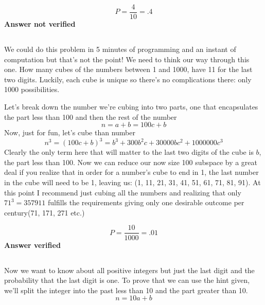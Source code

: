 \begin{equation}
	P=\frac{4}{10}=.4
\label{answer1.8}
\end{equation}
\textbf{Answer not verified}

\subsection{}

We could do this problem in 5 minutes of programming and an instant of computation but that's not the point!  We need to think our way through this one.  How many cubes of the numbers between 1 and 1000, have 11 for the last two digits.  Luckily, each cube is unique so there's no complications there: only 1000 possibilities.  

Let's break down the number we're cubing into two parts, one that encapsulates the part less than 100 and then the rest of the number
\begin{equation}
	n=a+b=100c+b
\end{equation}
Now, just for fun, let's cube than number
\begin{equation}
	n^3=(100c+b)^3=b^3+300 b^2 c+30000 b c^2+1000000 c^3
\end{equation}
Clearly the only term here that will matter to the last two digits of the cube is $b$, the part less than 100.  Now we can reduce our now size 100 subspace by a great deal if you realize that in order for a number's cube to end in 1, the last number in the cube will need to be 1, leaving us: (1, 11, 21, 31, 41, 51, 61, 71, 81, 91).  At this point I recommend just cubing all the numbers and realizing that only $71^3=357911$ fulfills the requirements giving only one desirable outcome per century(71, 171, 271 etc.)

\begin{equation}
	P=\frac{10}{1000}=.01
\label{answer1.9}
\end{equation}
\textbf{Answer verified}

\subsection{}
Now we want to know about all positive integers but just the last digit and the probability that the last digit is one.  To prove that we can use the hint given, we'll split the integer into the past less than 10 and the part greater than 10.
\begin{equation}
	n=10a+b
\end{equation}
